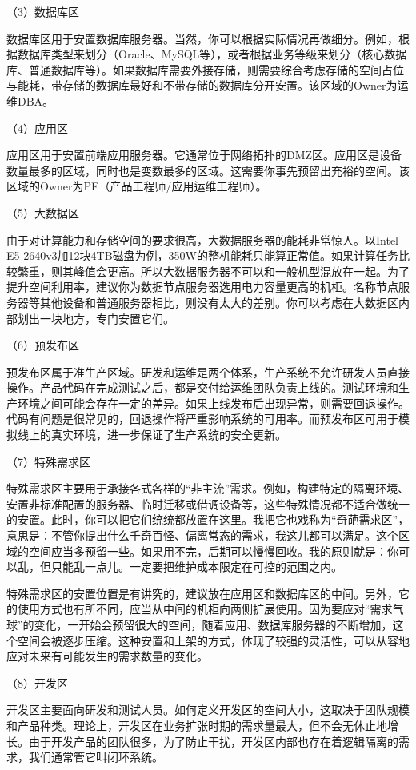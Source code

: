 \documentclass[12pt,UTF8]{ctexbook}
\begin{document}
（3）数据库区

数据库区用于安置数据库服务器。当然，你可以根据实际情况再做细分。例如，根据数据库类型来划分（Oracle、MySQL等），或者根据业务等级来划分（核心数据库、普通数据库等）。如果数据库需要外接存储，则需要综合考虑存储的空间占位与能耗，带存储的数据库最好和不带存储的数据库分开安置。该区域的Owner为运维DBA。

（4）应用区

应用区用于安置前端应用服务器。它通常位于网络拓扑的DMZ区。应用区是设备数量最多的区域，同时也是变数最多的区域。这需要你事先预留出充裕的空间。该区域的Owner为PE（产品工程师/应用运维工程师）。

（5）大数据区

由于对计算能力和存储空间的要求很高，大数据服务器的能耗非常惊人。以Intel E5-2640v3加12块4TB磁盘为例，350W的整机能耗只能算正常值。如果计算任务比较繁重，则其峰值会更高。所以大数据服务器不可以和一般机型混放在一起。为了提升空间利用率，建议你为数据节点服务器选用电力容量更高的机柜。名称节点服务器等其他设备和普通服务器相比，则没有太大的差别。你可以考虑在大数据区内部划出一块地方，专门安置它们。

（6）预发布区

预发布区属于准生产区域。研发和运维是两个体系，生产系统不允许研发人员直接操作。产品代码在完成测试之后，都是交付给运维团队负责上线的。测试环境和生产环境之间可能会存在一定的差异。如果上线发布后出现异常，则需要回退操作。代码有问题是很常见的，回退操作将严重影响系统的可用率。而预发布区可用于模拟线上的真实环境，进一步保证了生产系统的安全更新。

（7）特殊需求区

特殊需求区主要用于承接各式各样的“非主流”需求。例如，构建特定的隔离环境、安置非标准配置的服务器、临时迁移或借调设备等，这些特殊情况都不适合做统一的安置。此时，你可以把它们统统都放置在这里。我把它也戏称为“奇葩需求区”，意思是：不管你提出什么千奇百怪、偏离常态的需求，我这儿都可以满足。这个区域的空间应当多预留一些。如果用不完，后期可以慢慢回收。我的原则就是：你可以乱，但只能乱一点儿。一定要把维护成本限定在可控的范围之内。

特殊需求区的安置位置是有讲究的，建议放在应用区和数据库区的中间。另外，它的使用方式也有所不同，应当从中间的机柜向两侧扩展使用。因为要应对“需求气球”的变化，一开始会预留很大的空间，随着应用、数据库服务器的不断增加，这个空间会被逐步压缩。这种安置和上架的方式，体现了较强的灵活性，可以从容地应对未来有可能发生的需求数量的变化。

（8）开发区

开发区主要面向研发和测试人员。如何定义开发区的空间大小，这取决于团队规模和产品种类。理论上，开发区在业务扩张时期的需求量最大，但不会无休止地增长。由于开发产品的团队很多，为了防止干扰，开发区内部也存在着逻辑隔离的需求，我们通常管它叫闭环系统。
\end{document}
